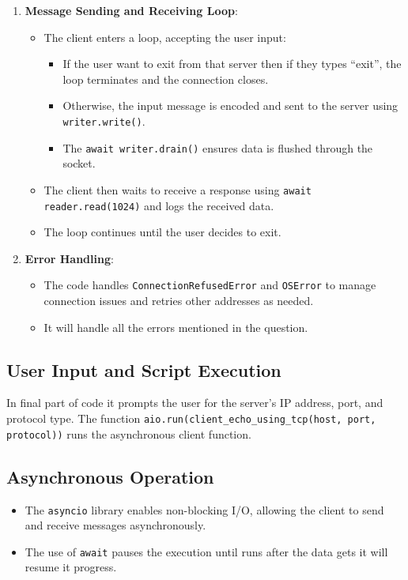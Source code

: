 \documentclass{exam}
\begin{document}
\begin{enumerate}
    \item \textbf{Message Sending and Receiving Loop}:
    \begin{itemize}
        \item The client enters a loop, accepting the user input: \begin{itemize}
            \item If the user want to exit from that server then if they  types ``exit'', the loop terminates and the connection closes.
            \item Otherwise, the input message is encoded and sent to the server using \texttt{writer.write()}.
            \item The \texttt{await writer.drain()} ensures data is flushed through the socket.
        \end{itemize}
        \item The client then waits to receive a response using \texttt{await reader.read(1024)} and logs the received data.
        \item The loop continues until the user decides to exit.
    \end{itemize}
    
    \item \textbf{Error Handling}:
    \begin{itemize}
        \item The code handles \texttt{ConnectionRefusedError} and \texttt{OSError} to manage connection issues and retries other addresses as needed.
        \item It will handle all the errors mentioned in the question.
    \end{itemize}
\end{enumerate}

\subsection*{User Input and Script Execution}
In final part of code it prompts the user for the server's IP address, port, and protocol type. The function \texttt{aio.run(client\_echo\_using\_tcp(host, port, protocol))} runs the asynchronous client function.

\subsection*{Asynchronous Operation}
\begin{itemize}
    \item The \texttt{asyncio} library enables non-blocking I/O, allowing the client to send and receive messages asynchronously.
    \item The use of \texttt{await} pauses the execution until runs after the data gets it will resume it progress.
\end{itemize}
\end{document}
